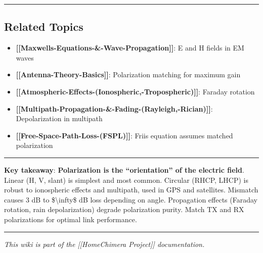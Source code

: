 \begin{center}\rule{0.5\linewidth}{0.5pt}\end{center}

\subsection{Related Topics}\label{related-topics}

\begin{itemize}
\tightlist
\item
  \textbf{{[}{[}Maxwell\textquotesingle s-Equations-\&-Wave-Propagation{]}{]}}:
  E and H fields in EM waves
\item
  \textbf{{[}{[}Antenna-Theory-Basics{]}{]}}: Polarization matching for
  maximum gain
\item
  \textbf{{[}{[}Atmospheric-Effects-(Ionospheric,-Tropospheric){]}{]}}:
  Faraday rotation
\item
  \textbf{{[}{[}Multipath-Propagation-\&-Fading-(Rayleigh,-Rician){]}{]}}:
  Depolarization in multipath
\item
  \textbf{{[}{[}Free-Space-Path-Loss-(FSPL){]}{]}}: Friis equation
  assumes matched polarization
\end{itemize}

\begin{center}\rule{0.5\linewidth}{0.5pt}\end{center}

\textbf{Key takeaway}: \textbf{Polarization is the ``orientation'' of
the electric field}. Linear (H, V, slant) is simplest and most common.
Circular (RHCP, LHCP) is robust to ionospheric effects and multipath,
used in GPS and satellites. Mismatch causes 3 dB to
\$\textbackslash infty\$ dB loss depending on angle. Propagation effects
(Faraday rotation, rain depolarization) degrade polarization purity.
Match TX and RX polarizations for optimal link performance.

\begin{center}\rule{0.5\linewidth}{0.5pt}\end{center}

\emph{This wiki is part of the {[}{[}Home\textbar Chimera Project{]}{]}
documentation.}
